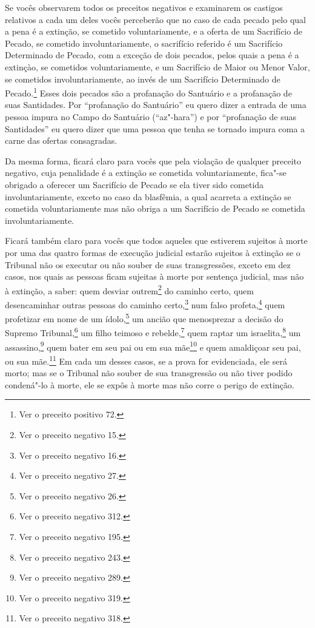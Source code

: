\begin{multicols}{2}
Se vocês observarem todos os preceitos negativos e examinarem os
castigos relativos a cada um deles vocês perceberão que no caso de cada
pecado pelo qual a pena é a extinção, se cometido voluntariamente, e a
oferta de um Sacrifício de Pecado, se cometido involuntariamente, o
sacrifício referido é um Sacrifício Determinado de Pecado, com a exceção
de dois pecados, pelos quais a pena é a extinçào, se cometidos
voluntariamente, e um Sacrifício de Maior ou Menor Valor, se cometidos
involuntariamente, ao invés de um Sacrifício Determinado de
Pecado.\footnote{Ver o preceito positivo 72.} Esses dois pecados são a profanação do
Santuário e a profanação de suas Santidades. Por ``profanação do
Santuário'' eu quero dizer a entrada de uma pessoa impura no Campo do
Santuário (``az"-hara'') e por ``profanação de suas Santidades'' eu quero
dizer que uma pessoa que tenha se tornado impura coma a carne das
ofertas consagradas.

Da mesma forma, ficará claro para vocês que pela violação de qualquer
preceito negativo, cuja penalidade é a extinção se cometida
voluntariamente, fica"-se obrigado a oferecer um Sacrifício de Pecado se
ela tiver sido cometida involuntariamente, exceto no caso da blasfêmia,
a qual acarreta a extinção se cometida voluntariamente mas não obriga a
um Sacrifício de Pecado se cometida involuntariamente.

Ficará também claro para vocês que todos aqueles que estiverem sujeitos
à morte por uma das quatro formas de execução judicial estarão sujeitos
à extinção se o Tribunal não os executar ou não souber de suas
transgressões, exceto em dez casos, nos quais as pessoas ficam sujeitas
à morte por sentença judicial, mas não à extinção, a saber: quem desviar
outrem\footnote{Ver o preceito negativo 15.} do caminho certo, quem desencaminhar outras
pessoas do caminho certo,\footnote{Ver o preceito negativo 16.} num falso
profeta,\footnote{Ver o preceito negativo 27.} quem profetizar em nome de um ídolo,\footnote{Ver o preceito negativo 26.} um ancião
que menosprezar a decisão do Supremo Tribunal,\footnote{Ver o preceito negativo 312.} um
filho teimoso e rebelde,\footnote{Ver o preceito negativo 195.} quem raptar um
israelita,\footnote{Ver o preceito negativo 243.} um assassino,\footnote{Ver o preceito negativo 289.}
quem bater em seu pai ou em sua mãe\footnote{Ver o preceito negativo 319.} e quem
amaldiçoar seu pai, ou sua mãe.\footnote{Ver o preceito negativo 318.} Em cada um desses
casos, se a prova for evidenciada, ele será morto; mas se o Tribunal não
souber de sua transgressão ou não tiver podido condená"-lo à morte, ele
se expôs à morte mas não corre o perigo de extinção.


\end{multicols}
